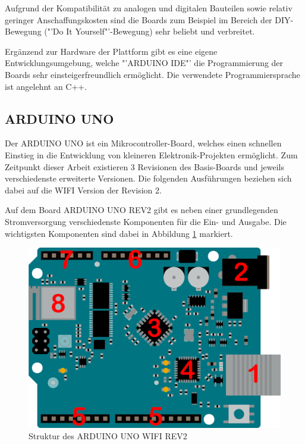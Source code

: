\documentclass[
    load-dhbw-templates,
    load-preamble = true,
    auto-intro-pages = all,
    add-tocs-to-toc,
    debug = true,
    language = english,
    mainlanguage = ngerman,
    add-bibliography,
    bib-file = dhbw-source.bib,
    biblatex/style = alphabetic, 
]{iodhbwm}
\begin{document}
        Aufgrund der Kompatibilität zu analogen und digitalen Bauteilen sowie relativ geringer Anschaffungskosten sind die Boards zum Beispiel im Bereich der DIY-Bewegung ("'Do It Yourself"'-Bewegung) sehr beliebt und verbreitet.

        Ergänzend zur Hardware der Plattform gibt es eine eigene Entwicklungsumgebung, welche "'ARDUINO IDE"' die Programmierung der Boards sehr einsteigerfreundlich ermöglicht. Die verwendete Programmiersprache ist angelehnt an C++.

        \subsection{ARDUINO UNO}


        Der ARDUINO UNO ist ein Mikrocontroller-Board, welches einen schnellen Einstieg in die Entwicklung von kleineren Elektronik-Projekten ermöglicht. Zum Zeitpunkt dieser Arbeit existieren 3 Revisionen des Basis-Boards und jeweils verschiedenste erweiterte Versionen. Die folgenden Ausführungen beziehen sich dabei auf die WIFI Version der Revision 2.

        Auf dem Board ARDUINO UNO REV2 gibt es neben einer grundlegenden Stromversorgung verschiedenste Komponenten für die Ein- und Ausgabe. Die wichtigsten Komponenten sind dabei in Abbildung \ref{fig:ARDUINOUNOSketch} markiert.

        \begin{figure}[H]
            \centering
            \includegraphics[scale=0.25]{../Quellenangaben/Dokumente/ARDUINO UNO REV2 Dokumentation/unorev2_edited.png}
            \caption[ARDUINOUNOSketch]{Struktur des ARDUINO UNO WIFI REV2 \footnotemark}
            \label{fig:ARDUINOUNOSketch} 
        \end{figure}
            
\end{document}
